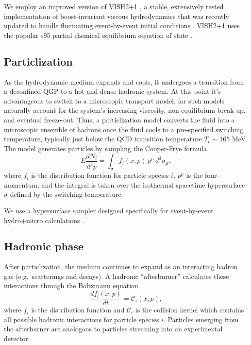 \documentclass[aps,prc,reprint,superscriptaddress,amsmath]{revtex4-1}
\begin{document}
We employ an improved version of VISH2+1 \cite{Song:2007ux}, a stable, extensively tested implementation of boost-invariant viscous hydrodynamics that was recently updated to handle fluctuating event-by-event initial conditions \cite{Shen:2014vra}.
VISH2+1 uses the popular s95 partial chemical equilibrium equation of state \cite{Huovinen:2009yb}.

\subsection{Particlization}

As the hydrodynamic medium expands and cools, it undergoes a transition from a deconfined QGP to a hot and dense hadronic system.
At this point it's advantageous to switch to a microscopic transport model, for such models naturally account for the system's increasing viscosity, non-equilibrium break-up, and eventual freeze-out.
Thus, a particlization model converts the fluid into a microscopic ensemble of hadrons once the fluid cools to a pre-specified switching temperature, typically just below the QCD transition temperature $T_c \sim 165$ MeV.
The model generates particles by sampling the Cooper-Frye formula \cite{Cooper:1974mv}
\begin{equation}
  E \frac{dN_i}{d^3p} = \int_\sigma f_i(x,p) \, p^\mu \, d^3\sigma_\mu,
\end{equation}
where $f_i$ is the distribution function for particle species $i$, $p^\mu$ is the four-momentum, and the integral is taken over the isothermal spacetime hypersurface $\sigma$ defined by the switching temperature.

We use a hypersurface sampler designed specifically for event-by-event hydro+micro calculations \cite{Qiu:2013wca,Shen:2014vra}.

\subsection{Hadronic phase}

After particlization, the medium continues to expand as an interacting hadron gas (e.g.\ scatterings and decays).
A hadronic ``afterburner'' calculates these interactions through the Boltzmann equation
\begin{equation}
  \frac{df_i(x,p)}{dt} = \mathcal C_i(x,p),
\end{equation}
where $f_i$ is the distribution function and $\mathcal C_i$ is the collision kernel which contains all possible hadronic interactions for particle species $i$.
Particles emerging from the afterburner are analogous to particles streaming into an experimental detector.
\end{document}
